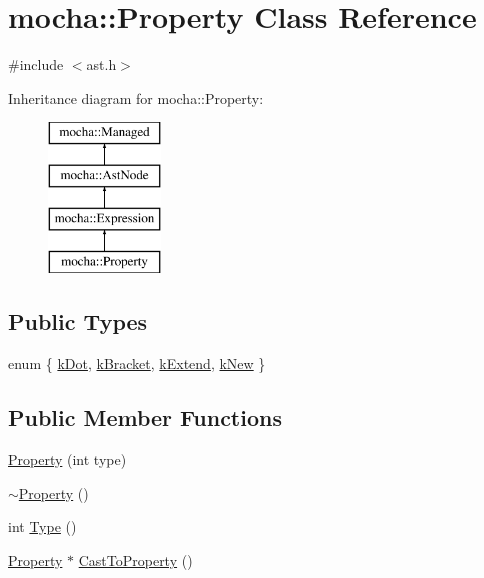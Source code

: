 \hypertarget{classmocha_1_1_property}{
\section{mocha::Property Class Reference}
\label{classmocha_1_1_property}
}


{\ttfamily \#include $<$ast.h$>$}

Inheritance diagram for mocha::Property:\begin{figure}[H]
\begin{center}
\leavevmode
\includegraphics[height=4.000000cm]{classmocha_1_1_property}
\end{center}
\end{figure}
\subsection*{Public Types}
\begin{DoxyCompactItemize}
\item 
enum \{ \hyperlink{classmocha_1_1_property_a01fca1d5284de1e187b79f0760573eaea75981815d6cef7558c29e66f900a826f}{kDot}, 
\hyperlink{classmocha_1_1_property_a01fca1d5284de1e187b79f0760573eaea95807b66fe9d1ad15a36d2fe36575b7f}{kBracket}, 
\hyperlink{classmocha_1_1_property_a01fca1d5284de1e187b79f0760573eaea4bfd95a31cf96b1636bcc4b7725c7926}{kExtend}, 
\hyperlink{classmocha_1_1_property_a01fca1d5284de1e187b79f0760573eaea471080bd9724c1fb1dcdb676e3fcf25a}{kNew}
 \}
\end{DoxyCompactItemize}
\subsection*{Public Member Functions}
\begin{DoxyCompactItemize}
\item 
\hyperlink{classmocha_1_1_property_a4916a9751dd474e8af7b87795e0d4c80}{Property} (int type)
\item 
\hyperlink{classmocha_1_1_property_a925559fed88653099b6d2a39e9ed710d}{$\sim$Property} ()
\item 
int \hyperlink{classmocha_1_1_property_ae440e907aba069ada470ccf6344dc9af}{Type} ()
\item 
\hyperlink{classmocha_1_1_property}{Property} $\ast$ \hyperlink{classmocha_1_1_property_a8c9aa3a00789174a3ce32e7f8a86edfe}{CastToProperty} ()
\end{DoxyCompactItemize}
